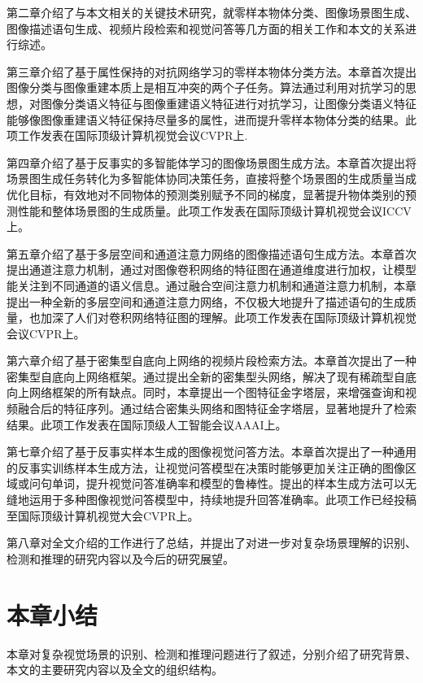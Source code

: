 \begin{asparaitem}

\item 第二章介绍了与本文相关的关键技术研究，就零样本物体分类、图像场景图生成、图像描述语句生成、视频片段检索和视觉问答等几方面的相关工作和本文的关系进行综述。

\item 第三章介绍了基于属性保持的对抗网络学习的零样本物体分类方法。本章首次提出图像分类与图像重建本质上是相互冲突的两个子任务。算法通过利用对抗学习的思想，对图像分类语义特征与图像重建语义特征进行对抗学习，让图像分类语义特征能够像图像重建语义特征保持尽量多的属性，进而提升零样本物体分类的结果。此项工作发表在国际顶级计算机视觉会议CVPR上.

\item 第四章介绍了基于反事实的多智能体学习的图像场景图生成方法。本章首次提出将场景图生成任务转化为多智能体协同决策任务，直接将整个场景图的生成质量当成优化目标，有效地对不同物体的预测类别赋予不同的梯度，显著提升物体类别的预测性能和整体场景图的生成质量。此项工作发表在国际顶级计算机视觉会议ICCV上。


\item 第五章介绍了基于多层空间和通道注意力网络的图像描述语句生成方法。本章首次提出通道注意力机制，通过对图像卷积网络的特征图在通道维度进行加权，让模型能关注到不同通道的语义信息。通过融合空间注意力机制和通道注意力机制，本章提出一种全新的多层空间和通道注意力网络，不仅极大地提升了描述语句的生成质量，也加深了人们对卷积网络特征图的理解。此项工作发表在国际顶级计算机视觉会议CVPR上。


\item 第六章介绍了基于密集型自底向上网络的视频片段检索方法。本章首次提出了一种密集型自底向上网络框架。通过提出全新的密集型头网络，解决了现有稀疏型自底向上网络框架的所有缺点。同时，本章提出一个图特征金字塔层，来增强查询和视频融合后的特征序列。通过结合密集头网络和图特征金字塔层，显著地提升了检索结果。此项工作发表在国际顶级人工智能会议AAAI上。


\item 第七章介绍了基于反事实样本生成的图像视觉问答方法。本章首次提出了一种通用的反事实训练样本生成方法，让视觉问答模型在决策时能够更加关注正确的图像区域或问句单词，提升视觉问答准确率和模型的鲁棒性。提出的样本生成方法可以无缝地运用于多种图像视觉问答模型中，持续地提升回答准确率。此项工作已经投稿至国际顶级计算机视觉大会CVPR上。


\item 第八章对全文介绍的工作进行了总结，并提出了对进一步对复杂场景理解的识别、检测和推理的研究内容以及今后的研究展望。

\end{asparaitem}


\section{本章小结}
本章对复杂视觉场景的识别、检测和推理问题进行了叙述，分别介绍了研究背景、本文的主要研究内容以及全文的组织结构。

